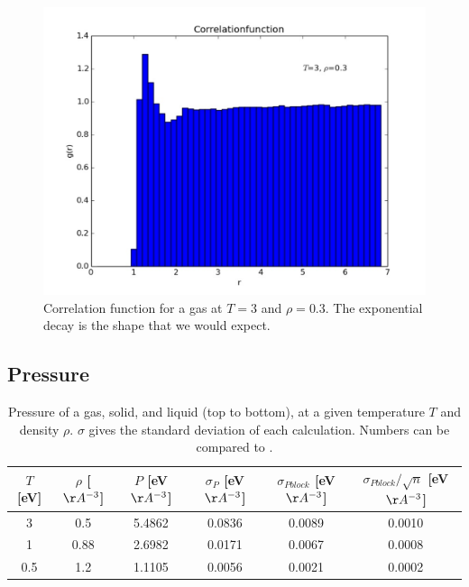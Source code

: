 \documentclass{article}
\begin{document}
\begin{multicols}{2}
\begin{figure}[H]
\begin{center}
\includegraphics[width=\linewidth]{plots/correlationfunctionT3Rho03x.pdf}
\caption{Correlation function for a gas at $T=3$ and $\rho = 0.3$.  The exponential decay is the shape that we would expect.}
\label{corgas}
\end{center}
\end{figure}

\subsection{Pressure}

\begin{table}
\begin{center}
\begin{tabular}{| c | c | c | c | c | c |}
\hline  $T$ [eV] & $\rho$ [$\AA ^{-3}$] & $P$ [eV$\AA ^{-3}$] & $\sigma_{P}$ [eV$\AA ^{-3}$]  & $\sigma_{Pblock}$ [eV$\AA ^{-3}$] & $\sigma_{Pblock}/ \sqrt n$ [eV$\AA ^{-3}$] \\ \hline
  3 & 0.5 & 5.4862 & 0.0836 & 0.0089 & 0.0010 \\ \hline
  1 & 0.88 & 2.6982 & 0.0171 & 0.0067 & 0.0008 \\ \hline
  0.5 & 1.2 & 1.1105 & 0.0056 & 0.0021 & 0.0002 \\ \hline
\end{tabular}
\label{pressuretab}
\caption{Pressure of a gas, solid, and liquid (top to bottom), at a given temperature $T$ and density $\rho$.  $\sigma$ gives the standard deviation of each calculation. Numbers can be compared to \cite{thijssen}.}
\end{center}
\end{table}


\end{multicols}
\end{document}
